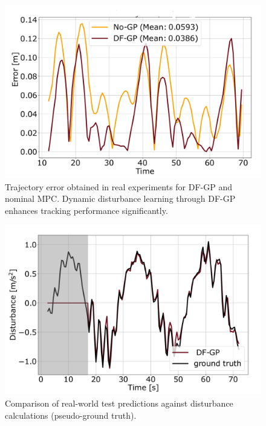 \begin{figure}[t]
	\centering	\includegraphics[width=1.0\linewidth]{figures/Expirements/error_real.pdf}
	\caption{Trajectory error obtained in real experiments for  \ac{DF-GP} and nominal \ac{MPC}. Dynamic disturbance learning through \ac{DF-GP} enhances tracking performance significantly.}
	\label{fig:error-real}
\end{figure}


\begin{figure}[t]
	\centering	\includegraphics[width=1.0\linewidth]{figures/Expirements/pred_real.pdf}
	\caption{Comparison of real-world test predictions against disturbance calculations (pseudo-ground truth).} %
	\label{fig:pred_dist_real}
\end{figure}







